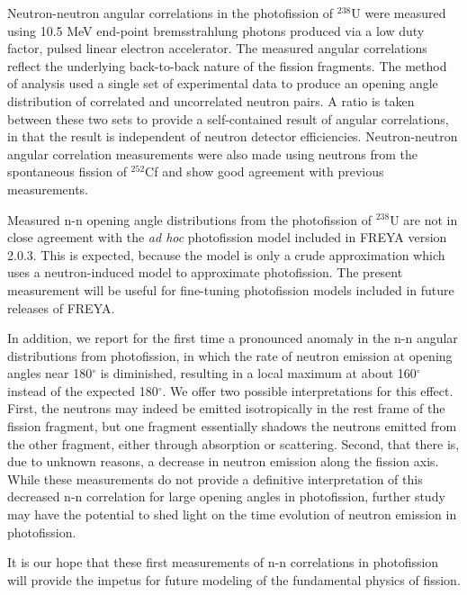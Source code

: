 Neutron-neutron angular correlations in the photofission of $^{238}$U were measured using 10.5 MeV end-point bremsstrahlung photons produced via a low duty factor, pulsed linear electron accelerator.
The measured angular correlations reflect the underlying back-to-back nature of the fission fragments.
The method of analysis used a single set of experimental data to produce an opening angle distribution of correlated and uncorrelated neutron pairs.
A ratio is taken between these two sets to provide a self-contained result of angular correlations, in that the result is independent of neutron detector efficiencies.
Neutron-neutron angular correlation measurements were also made using neutrons from the spontaneous fission of $^{252}$Cf and show good agreement with previous measurements.

Measured n-n opening angle distributions from the photofission of $^{238}$U are not in close agreement with the \textit{ad hoc} photofission model included in FREYA version 2.0.3.
This is expected, because the model is only a crude approximation which uses a neutron-induced model to approximate photofission.
The present measurement will be useful for fine-tuning photofission models included in future releases of FREYA.

In addition, we report for the first time a pronounced anomaly in the n-n angular distributions from photofission, in which the rate of neutron emission at opening angles near 180$^{\circ}$ is diminished, resulting in a local maximum at about 160$^{\circ}$ instead of the expected 180$^{\circ}$.
We offer two possible interpretations for this effect.
First, the neutrons may indeed be emitted isotropically in the rest frame of the fission fragment, but one fragment essentially shadows the neutrons emitted from the other fragment, either through absorption or scattering.
Second, that there is, due to unknown reasons, a decrease in neutron emission along the fission axis.
While these measurements do not provide a definitive interpretation of this decreased n-n correlation for large opening angles in photofission, further study may have the potential to shed light on the time evolution of neutron emission in photofission.

It is our hope that these first measurements of n-n correlations in photofission will provide the impetus for future modeling of the fundamental physics of fission.
